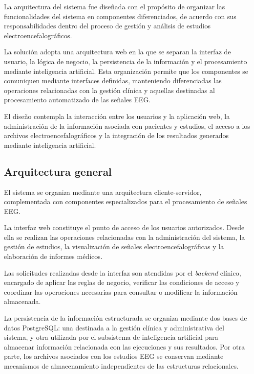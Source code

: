 La arquitectura del sistema fue diseñada con el propósito de organizar
las funcionalidades del sistema en componentes diferenciados, de acuerdo
con sus responsabilidades dentro del proceso de gestión y análisis de
estudios electroencefalográficos.

La solución adopta una arquitectura web en la que se separan la
interfaz de usuario, la lógica de negocio, la persistencia de la
información y el procesamiento mediante inteligencia artificial.
Esta organización permite que los componentes se comuniquen mediante
interfaces definidas, manteniendo diferenciadas las operaciones
relacionadas con la gestión clínica y aquellas destinadas al
procesamiento automatizado de las señales EEG.

El diseño contempla la interacción entre los usuarios y la aplicación
web, la administración de la información asociada con pacientes y
estudios, el acceso a los archivos electroencefalográficos y la
integración de los resultados generados mediante inteligencia
artificial.

\subsection{Arquitectura general}
\label{subsec:arquitectura-general}

El sistema se organiza mediante una arquitectura cliente-servidor,
complementada con componentes especializados para el procesamiento
de señales EEG.

La interfaz web constituye el punto de acceso de los usuarios
autorizados. Desde ella se realizan las operaciones relacionadas
con la administración del sistema, la gestión de estudios, la
visualización de señales electroencefalográficas y la elaboración
de informes médicos.

Las solicitudes realizadas desde la interfaz son atendidas por
el \textit{backend} clínico, encargado de aplicar las reglas de negocio,
verificar las condiciones de acceso y coordinar las operaciones
necesarias para consultar o modificar la información almacenada.

La persistencia de la información estructurada se organiza mediante dos bases de datos PostgreSQL: una destinada a la gestión clínica y administrativa del sistema, y otra utilizada por el subsistema de inteligencia artificial para almacenar información relacionada con las ejecuciones y sus resultados. Por otra parte, los archivos asociados con los estudios EEG se conservan mediante mecanismos de almacenamiento independientes de las estructuras relacionales.

